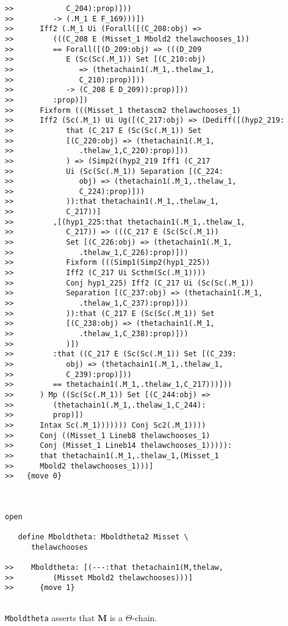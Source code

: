 \documentclass[12pt]{article}
\begin{document}
\begin{verbatim}
>>            C_204):prop)]))
>>         -> (.M_1 E F_169)))])
>>      Iff2 (.M_1 Ui (Forall([(C_208:obj) =>
>>         (((C_208 E (Misset_1 Mbold2 thelawchooses_1))
>>         == Forall([(D_209:obj) => (((D_209
>>            E (Sc(Sc(.M_1)) Set [(C_210:obj)
>>               => (thetachain1(.M_1,.thelaw_1,
>>               C_210):prop)]))
>>            -> (C_208 E D_209)):prop)]))
>>         :prop)])
>>      Fixform (((Misset_1 thetascm2 thelawchooses_1)
>>      Iff2 (Sc(.M_1) Ui Ug([(C_217:obj) => (Dediff([(hyp2_219:
>>            that (C_217 E (Sc(Sc(.M_1)) Set
>>            [(C_220:obj) => (thetachain1(.M_1,
>>               .thelaw_1,C_220):prop)]))
>>            ) => (Simp2((hyp2_219 Iff1 (C_217
>>            Ui (Sc(Sc(.M_1)) Separation [(C_224:
>>               obj) => (thetachain1(.M_1,.thelaw_1,
>>               C_224):prop)]))
>>            )):that thetachain1(.M_1,.thelaw_1,
>>            C_217))]
>>         ,[(hyp1_225:that thetachain1(.M_1,.thelaw_1,
>>            C_217)) => (((C_217 E (Sc(Sc(.M_1))
>>            Set [(C_226:obj) => (thetachain1(.M_1,
>>               .thelaw_1,C_226):prop)]))
>>            Fixform (((Simp1(Simp2(hyp1_225))
>>            Iff2 (C_217 Ui Scthm(Sc(.M_1))))
>>            Conj hyp1_225) Iff2 (C_217 Ui (Sc(Sc(.M_1))
>>            Separation [(C_237:obj) => (thetachain1(.M_1,
>>               .thelaw_1,C_237):prop)]))
>>            )):that (C_217 E (Sc(Sc(.M_1)) Set
>>            [(C_238:obj) => (thetachain1(.M_1,
>>               .thelaw_1,C_238):prop)]))
>>            )])
>>         :that ((C_217 E (Sc(Sc(.M_1)) Set [(C_239:
>>            obj) => (thetachain1(.M_1,.thelaw_1,
>>            C_239):prop)]))
>>         == thetachain1(.M_1,.thelaw_1,C_217)))]))
>>      ) Mp ((Sc(Sc(.M_1)) Set [(C_244:obj) =>
>>         (thetachain1(.M_1,.thelaw_1,C_244):
>>         prop)])
>>      Intax Sc(.M_1))))))) Conj Sc2(.M_1))))
>>      Conj ((Misset_1 Lineb8 thelawchooses_1)
>>      Conj (Misset_1 Lineb14 thelawchooses_1))))):
>>      that thetachain1(.M_1,.thelaw_1,(Misset_1
>>      Mbold2 thelawchooses_1)))]
>>   {move 0}



open

   define Mboldtheta: Mboldtheta2 Misset \
      thelawchooses

>>    Mboldtheta: [(---:that thetachain1(M,thelaw,
>>         (Misset Mbold2 thelawchooses)))]
>>      {move 1}


\end{verbatim}

{\tt Mboldtheta} asserts that {\bf M} is a $\Theta$-chain. 
\end{document}
